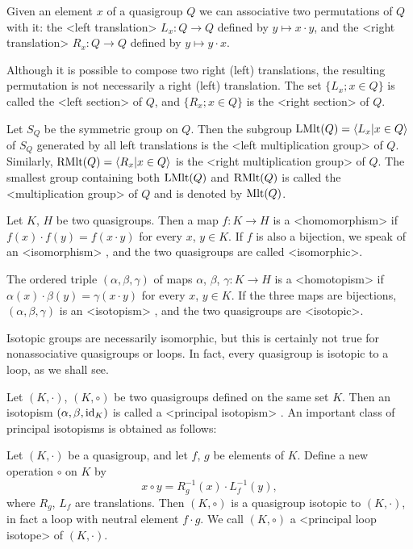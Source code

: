 Given an element $x$ of a quasigroup $Q$ we can associative two permutations of
$Q$ with it: the <left translation>
%
%
 $L_x:Q\to Q$ defined by $y\mapsto
x\cdot y$, and the <right translation>
%
%
 $R_x:Q\to Q$ defined by $y\mapsto
y\cdot x$.

Although it is possible to compose two right (left) translations, the resulting
permutation is not necessarily a right (left) translation. The set $\{L_x;x\in
Q\}$ is called the <left section>
%
%
 of $Q$, and $\{R_x;x\in Q\}$ is the
<right section>
%
%
 of $Q$.

Let $S_Q$ be the symmetric group on $Q$. Then the subgroup ${\rm{LMlt}}(Q)=\langle
L_x|x\in Q\rangle$ of $S_Q$ generated by all left translations is the
<left multiplication group>
%
%
 of $Q$. Similarly, ${\rm{RMlt}}(Q)= \langle R_x|x\in
Q\rangle$ is the <right multiplication group>
%
%
 of $Q$. The smallest group containing both ${\rm{LMlt}}(Q)$ and
${\rm{RMlt}}(Q)$ is called the <multiplication group>
%
%
 of $Q$ and is denoted by ${\rm{Mlt}}(Q)$.


Let $K$, $H$ be two quasigroups. Then a map $f:K\to H$ is a <homomorphism>
%
%
 if $f(x)\cdot f(y)=f(x\cdot y)$ for every $x$, $y\in K$. If
$f$ is also a bijection, we speak of an <isomorphism>
%
%
, and the two quasigroups are called <isomorphic>.

The ordered triple $(\alpha,\beta,\gamma)$ of maps $\alpha$, $\beta$,
$\gamma:K\to H$ is a <homotopism>
%
%
 if $\alpha(x)\cdot\beta(y) =
\gamma(x\cdot y)$ for every $x$, $y\in K$. If the three maps are bijections,
$(\alpha,\beta,\gamma)$ is an <isotopism>
%
%
, and the two quasigroups are
<isotopic>.

Isotopic groups are necessarily isomorphic, but this is certainly not true for
nonassociative quasigroups or loops. In fact, every quasigroup is isotopic to a
loop, as we shall see.

Let $(K,\cdot)$, $(K,\circ)$ be two quasigroups defined on the same set $K$.
Then an isotopism $(\alpha,\beta,{\rm{id}}_K)$ is called a <principal isotopism>
%
%
. An important class of principal isotopisms is obtained as follows:

Let $(K,\cdot)$ be a quasigroup, and let $f$, $g$ be elements of $K$. Define a
new operation $\circ$ on $K$ by
$$
    x\circ y = R_g^{-1}(x)\cdot L_f^{-1}(y),
$$
where $R_g$, $L_f$ are translations. Then $(K,\circ)$ is a quasigroup isotopic
to $(K,\cdot)$, in fact a loop with neutral element $f\cdot g$. We call
$(K,\circ)$ a <principal loop isotope>
%
%
 of $(K,\cdot)$.
